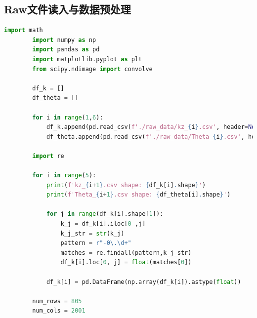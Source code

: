 \documentclass[a4paper]{article}
\begin{document}
	\subsection{Raw文件读入与数据预处理}
	\begin{lstlisting}[language=python,columns=fullflexible,frame=shadowbox]
		import math
		import numpy as np
		import pandas as pd
		import matplotlib.pyplot as plt
		from scipy.ndimage import convolve

		df_k = []
		df_theta = []

		for i in range(1,6):
			df_k.append(pd.read_csv(f'./raw_data/kz_{i}.csv', header=None))
			df_theta.append(pd.read_csv(f'./raw_data/Theta_{i}.csv', header=None ))
			
		import re

		for i in range(5):
			print(f'kz_{i+1}.csv shape: {df_k[i].shape}')
			print(f'Theta_{i+1}.csv shape: {df_theta[i].shape}')
			
			for j in range(df_k[i].shape[1]):
				k_j = df_k[i].iloc[0 ,j]
				k_j_str = str(k_j)
				pattern = r"-0\.\d+"
				matches = re.findall(pattern,k_j_str)
				df_k[i].loc[0, j] = float(matches[0])
				
			df_k[i] = pd.DataFrame(np.array(df_k[i]).astype(float))
							
		num_rows = 805
		num_cols = 2001
	\end{lstlisting}
\end{document}
